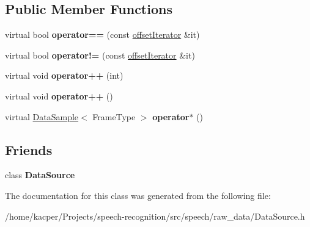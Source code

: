 \subsection*{Public Member Functions}
\begin{DoxyCompactItemize}
\item 
\hypertarget{classspeech_1_1raw__data_1_1DataSource_1_1offsetIterator_a2cba201886aaa45cc7a71ce294a47491}{virtual bool {\bfseries operator==} (const \hyperlink{classspeech_1_1raw__data_1_1DataSource_1_1offsetIterator}{offset\+Iterator} \&it)}\label{classspeech_1_1raw__data_1_1DataSource_1_1offsetIterator_a2cba201886aaa45cc7a71ce294a47491}

\item 
\hypertarget{classspeech_1_1raw__data_1_1DataSource_1_1offsetIterator_a6f19eda5eed84b836b90a78ac06c8646}{virtual bool {\bfseries operator!=} (const \hyperlink{classspeech_1_1raw__data_1_1DataSource_1_1offsetIterator}{offset\+Iterator} \&it)}\label{classspeech_1_1raw__data_1_1DataSource_1_1offsetIterator_a6f19eda5eed84b836b90a78ac06c8646}

\item 
\hypertarget{classspeech_1_1raw__data_1_1DataSource_1_1offsetIterator_a168b72b3e990f0d13c3be9630d8f5db3}{virtual void {\bfseries operator++} (int)}\label{classspeech_1_1raw__data_1_1DataSource_1_1offsetIterator_a168b72b3e990f0d13c3be9630d8f5db3}

\item 
\hypertarget{classspeech_1_1raw__data_1_1DataSource_1_1offsetIterator_a10edaa7cbd9ac318ac5643f4aa67d758}{virtual void {\bfseries operator++} ()}\label{classspeech_1_1raw__data_1_1DataSource_1_1offsetIterator_a10edaa7cbd9ac318ac5643f4aa67d758}

\item 
\hypertarget{classspeech_1_1raw__data_1_1DataSource_1_1offsetIterator_ae2226d1a53c74574087169b1a2c5ab78}{virtual \hyperlink{classspeech_1_1raw__data_1_1DataSample}{Data\+Sample}$<$ Frame\+Type $>$ {\bfseries operator$\ast$} ()}\label{classspeech_1_1raw__data_1_1DataSource_1_1offsetIterator_ae2226d1a53c74574087169b1a2c5ab78}

\end{DoxyCompactItemize}
\subsection*{Friends}
\begin{DoxyCompactItemize}
\item 
\hypertarget{classspeech_1_1raw__data_1_1DataSource_1_1offsetIterator_a7998ddaa8bd7c3b9a7cd2a8cbf3573c4}{class {\bfseries Data\+Source}}\label{classspeech_1_1raw__data_1_1DataSource_1_1offsetIterator_a7998ddaa8bd7c3b9a7cd2a8cbf3573c4}

\end{DoxyCompactItemize}


The documentation for this class was generated from the following file\+:\begin{DoxyCompactItemize}
\item 
/home/kacper/\+Projects/speech-\/recognition/src/speech/raw\+\_\+data/Data\+Source.\+h\end{DoxyCompactItemize}
